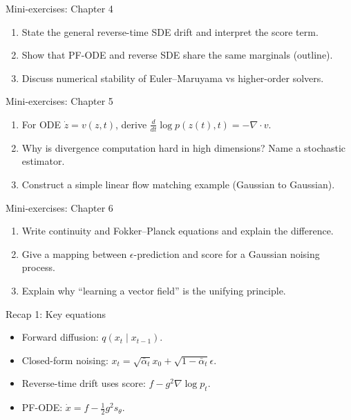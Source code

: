 \documentclass[aspectratio=169]{beamer}
\begin{document}
\begin{frame}{Mini-exercises: Chapter 4}
\begin{enumerate}
\item State the general reverse-time SDE drift and interpret the score term.
\item Show that PF-ODE and reverse SDE share the same marginals (outline).
\item Discuss numerical stability of Euler--Maruyama vs higher-order solvers.
\end{enumerate}
\end{frame}

\begin{frame}{Mini-exercises: Chapter 5}
\begin{enumerate}
\item For ODE \( \dot z=v(z,t)\), derive \( \frac{d}{dt}\log p(z(t),t)=-\nabla\cdot v\).
\item Why is divergence computation hard in high dimensions? Name a stochastic estimator.
\item Construct a simple linear flow matching example (Gaussian to Gaussian).
\end{enumerate}
\end{frame}

\begin{frame}{Mini-exercises: Chapter 6}
\begin{enumerate}
\item Write continuity and Fokker--Planck equations and explain the difference.
\item Give a mapping between \(\epsilon\)-prediction and score for a Gaussian noising process.
\item Explain why ``learning a vector field'' is the unifying principle.
\end{enumerate}
\end{frame}

\begin{frame}{Recap 1: Key equations}
\begin{itemize}
\item Forward diffusion: \(q(x_t\mid x_{t-1})\).
\item Closed-form noising: \(x_t=\sqrt{\bar\alpha_t}x_0+\sqrt{1-\bar\alpha_t}\epsilon\).
\item Reverse-time drift uses score: \(f-g^2 \nabla\log p_t\).
\item PF-ODE: \(\dot x=f-\tfrac12 g^2 s_\theta\).
\end{itemize}
\end{frame}
\end{document}
